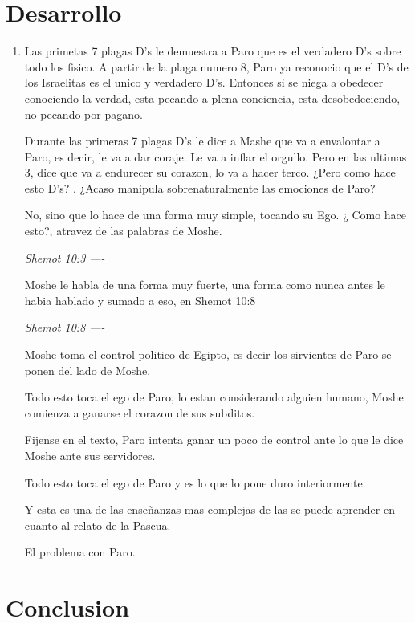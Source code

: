 \documentclass[conference]{IEEEtran}
\begin{document}
\section{Desarrollo}
\begin{enumerate}
 \item Las primetas 7 plagas D's le demuestra a Paro que es el verdadero D's sobre todo los fisico. A partir de la plaga numero 8, Paro ya reconocio que el D's de los Israelitas es el unico y verdadero D's. Entonces si se niega a obedecer conociendo la verdad, esta pecando a plena  conciencia, esta desobedeciendo, no pecando por pagano. 
 
Durante las primeras 7 plagas D's le dice a Mashe que va a envalontar a Paro, es decir, le va a dar coraje. Le va a inflar el orgullo.
Pero en las ultimas 3, dice que va a endurecer su corazon, lo va a hacer terco. 
¿Pero como hace esto D's? . ¿Acaso manipula sobrenaturalmente las emociones de Paro?

No, sino que lo hace de una forma muy simple, tocando su Ego. ¿ Como hace esto?, atravez de las palabras de Moshe. 


\textit{Shemot 10:3 ---- }

Moshe le habla de una forma muy fuerte, una forma como nunca antes le habia hablado y sumado a eso, en Shemot 10:8
 
 
 
\textit{Shemot 10:8 ---- }


Moshe toma el control politico de Egipto, es decir los sirvientes de Paro se ponen del lado de Moshe. 

Todo esto toca el ego de Paro, lo estan considerando alguien humano, Moshe comienza a ganarse el corazon de sus subditos.

Fijense en el texto, Paro intenta ganar un poco de control ante lo que le dice Moshe ante sus servidores.

Todo esto toca el ego de Paro y es lo que lo pone duro interiormente.


Y esta es una de las enseñanzas mas complejas de las se puede aprender en cuanto al relato de la Pascua. 


El problema con Paro. 

\end{enumerate}




\section{Conclusion}









\end{document}
